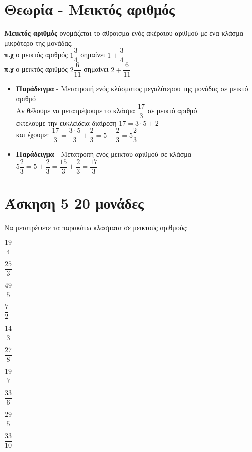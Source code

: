 \documentclass[a4paper,10pt]{report}
\begin{document}
\section*{Θεωρία - Μεικτός αριθμός\hfill \small{}}
\textbf{Μεικτός αριθμός} ονομάζεται το άθροισμα ενός ακέραιου αριθμού με ένα κλάσμα μικρότερο της μονάδας. \\
\textbf{π.χ} ο μεικτός αριθμός $1\dfrac{3}{4}$ σημαίνει $1+\dfrac{3}{4}$\\
\textbf{π.χ} ο μεικτός αριθμός $2\dfrac{6}{11}$ σημαίνει $2+\dfrac{6}{11}$
\begin{itemize}
 \item \textbf{Παράδειγμα} - Μετατροπή ενός κλάσματος μεγαλύτερου της μονάδας σε μεικτό αριθμό\\
       Αν θέλουμε να μετατρέψουμε το κλάσμα $\dfrac{17}{3}$ σε μεικτό αριθμό \\εκτελούμε την 
       ευκλείδεια διαίρεση $17=3\cdot 5+2$ \\και έχουμε: 
       $\dfrac{17}{3}=\dfrac{3\cdot 5}{3}+\dfrac{2}{3}=5+\dfrac{2}{3}=5\dfrac{2}{3}$
 \item \textbf{Παράδειγμα} - Μετατροπή ενός μεικτού αριθμού σε κλάσμα\\
        $5\dfrac{2}{3}=5+\dfrac{2}{3}=\dfrac{15}{3}+\dfrac{2}{3}=\dfrac{17}{3}$
\end{itemize}

\section*{Άσκηση 5  \hfill \small{20 μονάδες}}
Να μετατρέψετε τα παρακάτω κλάσματα σε μεικτούς αριθμούς:
\begin{enumerate}[1)]
\begin{multicols}{2}
 \item $\dfrac{19}{4}$
 \item $\dfrac{25}{3}$
 \item $\dfrac{49}{5}$
 \item $\dfrac{7}{2}$
 \item $\dfrac{14}{3}$
 \item $\dfrac{27}{8}$
 \item $\dfrac{19}{7}$
 \item $\dfrac{33}{6}$
 \item $\dfrac{29}{5}$
 \item $\dfrac{33}{10}$
\end{multicols}
\end{enumerate}

\newpage
\end{document}
